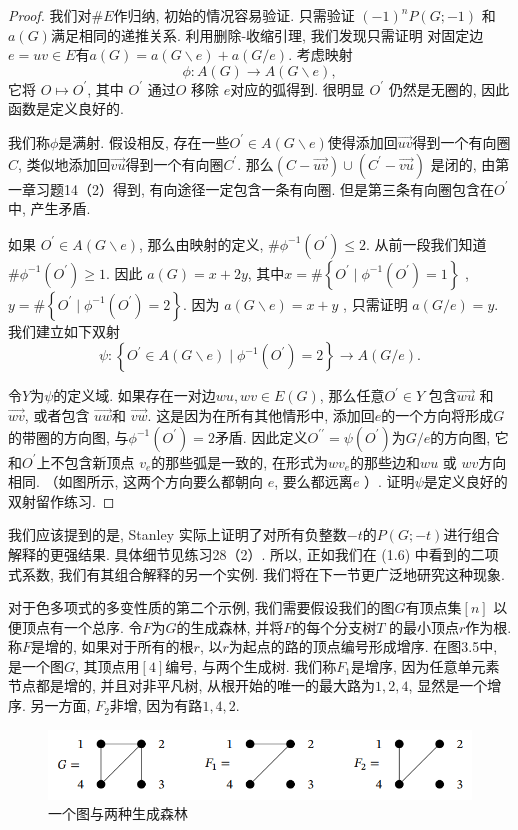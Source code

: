 \documentclass[a4paper,12pt]{ctexbook}
\begin{document}
\begin{proof}
	我们对$\# E$作归纳, 初始的情况容易验证. 只需验证 $(-1)^{n} P(G ;-1)$ 和$a(G)$满足相同的递推关系. 利用删除-收缩引理, 我们发现只需证明 对固定边$e=u v \in E$有$a(G)=a(G \backslash e)+a(G / e)$. 考虑映射
	$$
	\phi: A(G) \rightarrow A(G \backslash e),
	$$
它将 $O \mapsto O^{\prime}$, 其中 $O^{\prime}$ 通过$O$ 移除 $e$对应的弧得到. 很明显 $O^{\prime}$ 仍然是无圈的, 因此函数是定义良好的.

我们称$\phi$是满射. 假设相反, 存在一些$O^{\prime} \in A(G \backslash e)$使得添加回$\overrightarrow{u v}$得到一个有向圈$C$, 类似地添加回$\overrightarrow{v u}$得到一个有向圈$C^{\prime}$. 那么$(C-\overrightarrow{u v}) \cup\left(C^{\prime}-\overrightarrow{v u}\right)$ 是闭的, 由第一章习题14（2）得到, 有向途径一定包含一条有向圈. 但是第三条有向圈包含在$O^{\prime}$中, 产生矛盾.

如果 $O^{\prime} \in A(G \backslash e)$, 那么由映射的定义, $\# \phi^{-1}\left(O^{\prime}\right) \leq 2$. 从前一段我们知道$\#\phi^{-1}\left(O^{\prime}\right) \geq 1$. 因此 $a(G)=x+2 y$, 其中$x=\#\left\{O^{\prime} \mid \phi^{-1}\left(O^{\prime}\right)=1\right\}$ , $y=\#\left\{O^{\prime} \mid \phi^{-1}\left(O^{\prime}\right)=2\right\} $. 因为 $a(G \backslash e)=x+y$ , 只需证明 $a(G / e)=y$. 我们建立如下双射
$$
\psi:\left\{O^{\prime} \in A(G \backslash e) \mid \phi^{-1}\left(O^{\prime}\right)=2\right\} \rightarrow A(G / e) .
$$

令$Y$为$\psi$的定义域. 如果存在一对边$w u, w v \in E(G)$, 那么任意$O^{\prime} \in Y$ 包含$\overrightarrow{w u}$ 和 $\overrightarrow{w v}$, 或者包含 $\overrightarrow{u w}$和 $\overrightarrow{v w}$. 这是因为在所有其他情形中, 添加回$e$的一个方向将形成$G$的带圈的方向图, 与$\phi^{-1}\left(O^{\prime}\right)=2$矛盾.  因此定义$O^{\prime \prime}=\psi\left(O^{\prime}\right)$为$G / e$的方向图, 它和$O^{\prime}$上不包含新顶点 $v_{e}$的那些弧是一致的, 在形式为$w v_{e}$的那些边和$w u$ 或 $w v$方向相同. （如图所示, 这两个方向要么都朝向 $e$, 要么都远离$e$ ）. 证明$\psi$是定义良好的双射留作练习.
\end{proof}

我们应该提到的是, Stanley 实际上证明了对所有负整数$-t$的$P(G ;-t)$进行组合解释的更强结果. 具体细节见练习28（2）. 所以, 正如我们在 (1.6) 中看到的二项式系数, 我们有其组合解释的另一个实例. 我们将在下一节更广泛地研究这种现象.

对于色多项式的多变性质的第二个示例, 我们需要假设我们的图$G$有顶点集$[n]$ 以便顶点有一个总序. 令$F$为$G$的生成森林, 并将$F$的每个分支树$T$ 的最小顶点$r$作为根. 称$F$是增的, 如果对于所有的根$r$, 以$r$为起点的路的顶点编号形成增序. 在图3.5中, 是一个图$G$, 其顶点用$[4]$编号, 与两个生成树. 我们称$F_{1}$是增序, 因为任意单元素节点都是增的, 并且对非平凡树, 从根开始的唯一的最大路为$1,2,4$, 显然是一个增序. 另一方面, $F_{2}$非增, 因为有路$1,4,2$.
\begin{figure}[h]
	\centering
	\includegraphics[width=0.8\linewidth]{./fig3/3-5.png}
	\caption{\label{chapter} 一个图与两种生成森林}
\end{figure}
\end{document}
